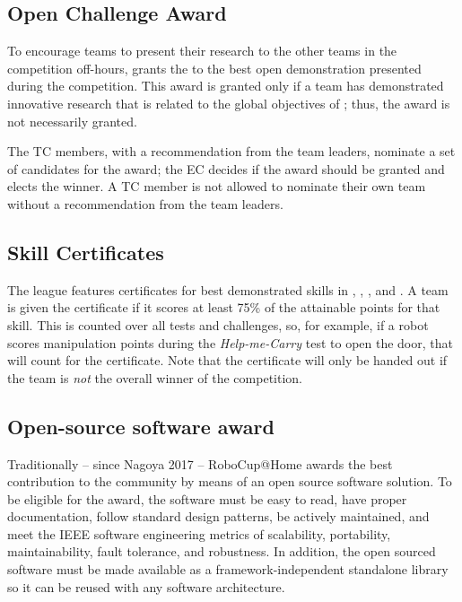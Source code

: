 \subsection{Open Challenge Award}
\label{award:oc}

To encourage teams to present their research to the other teams in the competition off-hours, \AtHome{} grants the \OCAward{} to the best open demonstration presented during the competition.
This award is granted only if a team has demonstrated innovative research that is related to the global objectives of \AtHome; thus, the award is not necessarily granted.

The \AtHome{} TC members, with a recommendation from the team leaders, nominate a set of candidates for the award; the EC decides if the award should be granted and elects the winner.
A TC member is not allowed to nominate their own team without a recommendation from the team leaders.

\subsection{Skill Certificates}
\label{award:skill}

The \AtHome{} league features certificates for best demonstrated skills in \NAV, \MAN, \PerRec, and \NLP.
A team is given the certificate if it scores at least 75\% of the attainable points for that skill.
This is counted over all tests and challenges, so, for example, if a robot scores manipulation points during the \emph{Help-me-Carry} test to open the door, that will count for the \MAN{} certificate.
Note that the certificate will only be handed out if the team is \emph{not} the overall winner of the competition.

\subsection{Open-source software award}
\label{award:oss}

Traditionally -- since Nagoya 2017 -- RoboCup@Home awards the best contribution to the community by means of an open source software solution.
To be eligible for the award, the software must be easy to read, have proper documentation, follow standard design patterns, be actively maintained, and meet the IEEE software engineering metrics of scalability, portability, maintainability, fault tolerance, and robustness.
In addition, the open sourced software must be made available as a framework-independent standalone library so it can be reused with any software architecture.

